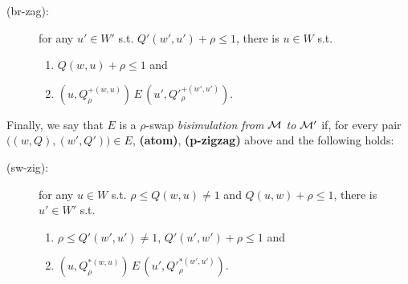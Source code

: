 \begin{definition}[Bisimulation]
\begin{description}
    \item[(br-zag):]  for any $u'\in W'$ s.t. $Q'(w',u')+\rho\le 1$, there is $u\in W$ s.t.
        \begin{enumerate}
            \item $Q(w,u)+\rho\le 1$ and 
            \item $(u,Q_\rho^{+(w,u)})\,E\,(u',Q'^{+(w',u')}_\rho)$.
        \end{enumerate}


\end{description}

Finally, we say that $E$ is a $\rho$-swap \emph{bisimulation from $\mathcal{M}$ to $\mathcal{M}'$} if, for every pair $\big((w,Q) ,(w',Q')\big)\in E$, \textbf{(atom)}, \textbf{(p-zigzag)} above and the following holds:

\begin{description}

    \item[(sw-zig):]  for any $u\in W$ s.t. $\rho\le Q(w,u)\neq 1$ and $Q(u,w)+\rho\le 1$, there is $u'\in W'$ s.t. 
        \begin{enumerate}
            \item $\rho\le Q'(w',u')\neq 1$, $Q'(u',w')+\rho\le 1$ and
            \item $(u,Q_\rho^{*(w,u)})\,E\,(u',Q'^{*(w',u')}_\rho)$.
        \end{enumerate}


\end{description}
\end{definition}
